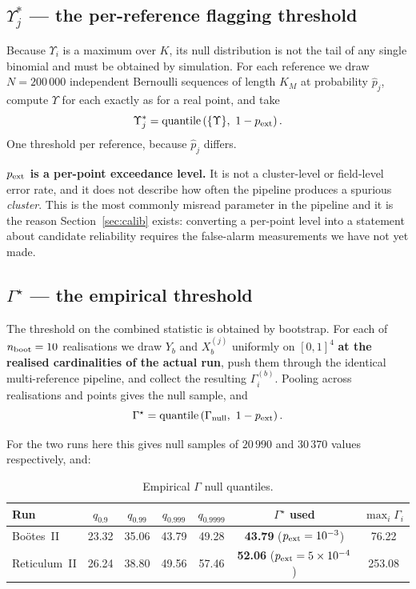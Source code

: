 \documentclass[11pt,a4paper]{article}
\newcommand{\Ups}{\Upsilon}                  %
\newcommand{\Gam}{\Gamma}                    %
\newcommand{\phat}{\hat{p}}                  %
\newcommand{\Ups}{\Upsilon}
\newcommand{\Gam}{\Gamma}
\newcommand{\Gstar}{\Gamma^{\star}}
\newcommand{\phat}{\hat{p}}
\begin{document}
\subsection{$\Ups^*_j$ --- the per-reference flagging threshold}
\label{sec:upsstar}

Because $\Ups_i$ is a maximum over $K$, its null distribution is not the tail of any single
binomial and must be obtained by simulation. For each reference we draw $N = 200\,000$ independent
Bernoulli sequences of length $K_M$ at probability $\phat_j$, compute $\Ups$ for each exactly as for
a real point, and take
%
\begin{equation}
\Ups^*_j = \mathrm{quantile}\left(\{\Ups\},\ 1 - p_{\rm ext}\right).
\end{equation}
%
One threshold per reference, because $\phat_j$ differs.

\textbf{$p_{\rm ext}$ is a per-point exceedance level.} It is not a cluster-level or field-level
error rate, and it does not describe how often the pipeline produces a spurious \emph{cluster}.
This is the most commonly misread parameter in the pipeline and it is the reason
Section~\ref{sec:calib} exists: converting a per-point level into a statement about candidate
reliability requires the false-alarm measurements we have not yet made.

\subsection{$\Gstar$ --- the empirical threshold}
\label{sec:gstar}

The threshold on the combined statistic is obtained by bootstrap. For each of
$n_{\rm boot} = 10$ realisations we draw $Y_b$ and $X_b^{(j)}$ uniformly on $[0,1]^4$ \textbf{at the
realised cardinalities of the actual run}, push them through the identical multi-reference
pipeline, and collect the resulting $\Gam_i^{(b)}$. Pooling across realisations and points gives the
null sample, and
%
\begin{equation}
\Gstar = \mathrm{quantile}\left(\Gam_{\rm null},\ 1 - p_{\rm ext}\right).
\end{equation}

For the two runs here this gives null samples of $20\,990$ and $30\,370$ values respectively, and:

\begin{table}[h]
\centering\small
\caption{Empirical $\Gam$ null quantiles.}
\begin{tabular}{@{}lcccccc@{}}
\toprule
Run & $q_{0.9}$ & $q_{0.99}$ & $q_{0.999}$ & $q_{0.9999}$ & $\Gstar$ used & $\max_i \Gam_i$\\
\midrule
Bo\"otes~II & 23.32 & 35.06 & 43.79 & 49.28 & \textbf{43.79} ($p_{\rm ext}=10^{-3}$) & 76.22\\
Reticulum~II & 26.24 & 38.80 & 49.56 & 57.46 & \textbf{52.06} ($p_{\rm ext}=5\times10^{-4}$) &
253.08\\
\bottomrule
\end{tabular}
\end{table}
\end{document}
